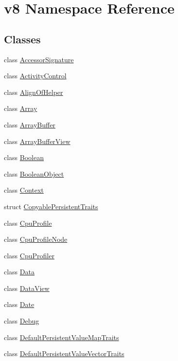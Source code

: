 \hypertarget{namespacev8}{}\section{v8 Namespace Reference}
\label{namespacev8}
\subsection*{Classes}
\begin{DoxyCompactItemize}
\item 
class \hyperlink{classv8_1_1_accessor_signature}{Accessor\+Signature}
\item 
class \hyperlink{classv8_1_1_activity_control}{Activity\+Control}
\item 
class \hyperlink{classv8_1_1_align_of_helper}{Align\+Of\+Helper}
\item 
class \hyperlink{classv8_1_1_array}{Array}
\item 
class \hyperlink{classv8_1_1_array_buffer}{Array\+Buffer}
\item 
class \hyperlink{classv8_1_1_array_buffer_view}{Array\+Buffer\+View}
\item 
class \hyperlink{classv8_1_1_boolean}{Boolean}
\item 
class \hyperlink{classv8_1_1_boolean_object}{Boolean\+Object}
\item 
class \hyperlink{classv8_1_1_context}{Context}
\item 
struct \hyperlink{structv8_1_1_copyable_persistent_traits}{Copyable\+Persistent\+Traits}
\item 
class \hyperlink{classv8_1_1_cpu_profile}{Cpu\+Profile}
\item 
class \hyperlink{classv8_1_1_cpu_profile_node}{Cpu\+Profile\+Node}
\item 
class \hyperlink{classv8_1_1_cpu_profiler}{Cpu\+Profiler}
\item 
class \hyperlink{classv8_1_1_data}{Data}
\item 
class \hyperlink{classv8_1_1_data_view}{Data\+View}
\item 
class \hyperlink{classv8_1_1_date}{Date}
\item 
class \hyperlink{classv8_1_1_debug}{Debug}
\item 
class \hyperlink{classv8_1_1_default_persistent_value_map_traits}{Default\+Persistent\+Value\+Map\+Traits}
\item 
class \hyperlink{classv8_1_1_default_persistent_value_vector_traits}{Default\+Persistent\+Value\+Vector\+Traits}
\item 

\end{DoxyCompactItemize}
